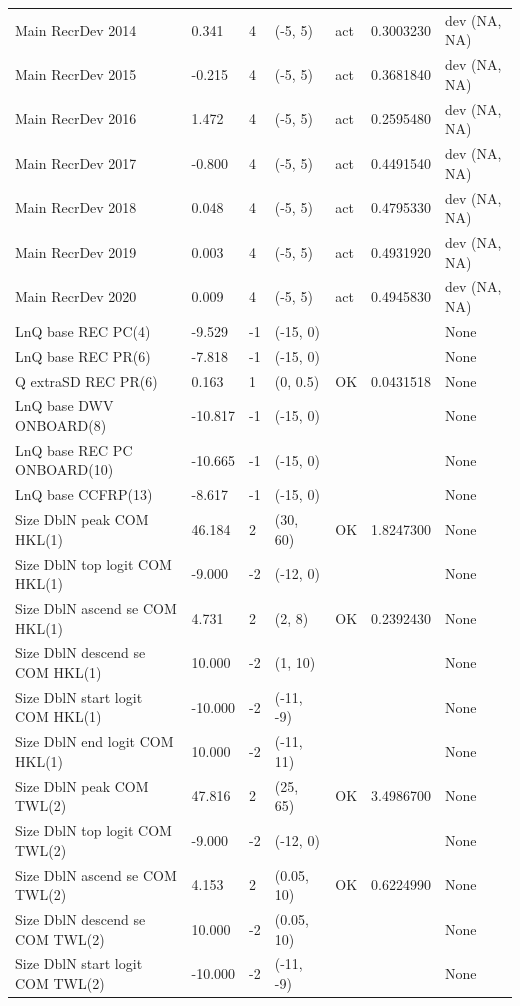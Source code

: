 \documentclass[
  english,
  a4paper,
]{article}
\begin{document}
\begin{landscape}
\begin{longtable}[t]{>{\raggedright\arraybackslash}p{8.5cm}lllll>{\raggedright\arraybackslash}p{4cm}}
Main RecrDev 2014 & 0.341 & 4 & (-5, 5) & act & 0.3003230 & dev (NA, NA)\\
Main RecrDev 2015 & -0.215 & 4 & (-5, 5) & act & 0.3681840 & dev (NA, NA)\\
Main RecrDev 2016 & 1.472 & 4 & (-5, 5) & act & 0.2595480 & dev (NA, NA)\\
Main RecrDev 2017 & -0.800 & 4 & (-5, 5) & act & 0.4491540 & dev (NA, NA)\\
Main RecrDev 2018 & 0.048 & 4 & (-5, 5) & act & 0.4795330 & dev (NA, NA)\\
Main RecrDev 2019 & 0.003 & 4 & (-5, 5) & act & 0.4931920 & dev (NA, NA)\\
Main RecrDev 2020 & 0.009 & 4 & (-5, 5) & act & 0.4945830 & dev (NA, NA)\\
LnQ base REC PC(4) & -9.529 & -1 & (-15, 0) &  &  & None\\
LnQ base REC PR(6) & -7.818 & -1 & (-15, 0) &  &  & None\\
Q extraSD REC PR(6) & 0.163 & 1 & (0, 0.5) & OK & 0.0431518 & None\\
LnQ base DWV ONBOARD(8) & -10.817 & -1 & (-15, 0) &  &  & None\\
LnQ base REC PC ONBOARD(10) & -10.665 & -1 & (-15, 0) &  &  & None\\
LnQ base CCFRP(13) & -8.617 & -1 & (-15, 0) &  &  & None\\
Size DblN peak COM HKL(1) & 46.184 & 2 & (30, 60) & OK & 1.8247300 & None\\
Size DblN top logit COM HKL(1) & -9.000 & -2 & (-12, 0) &  &  & None\\
Size DblN ascend se COM HKL(1) & 4.731 & 2 & (2, 8) & OK & 0.2392430 & None\\
Size DblN descend se COM HKL(1) & 10.000 & -2 & (1, 10) &  &  & None\\
Size DblN start logit COM HKL(1) & -10.000 & -2 & (-11, -9) &  &  & None\\
Size DblN end logit COM HKL(1) & 10.000 & -2 & (-11, 11) &  &  & None\\
Size DblN peak COM TWL(2) & 47.816 & 2 & (25, 65) & OK & 3.4986700 & None\\
Size DblN top logit COM TWL(2) & -9.000 & -2 & (-12, 0) &  &  & None\\
Size DblN ascend se COM TWL(2) & 4.153 & 2 & (0.05, 10) & OK & 0.6224990 & None\\
Size DblN descend se COM TWL(2) & 10.000 & -2 & (0.05, 10) &  &  & None\\
Size DblN start logit COM TWL(2) & -10.000 & -2 & (-11, -9) &  &  & None\\

\end{longtable}
\end{landscape}
\end{document}
